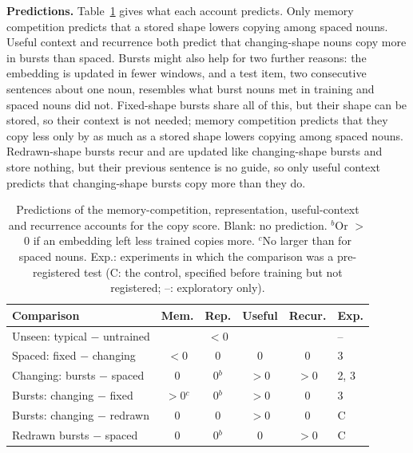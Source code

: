 \documentclass[11pt]{article}
\begin{document}
\textbf{Predictions.} Table~\ref{tab:pred} gives what each account predicts. Only memory competition predicts that a stored shape lowers copying among spaced nouns. Useful context and recurrence both predict that changing-shape nouns copy more in bursts than spaced. Bursts might also help for two further reasons: the embedding is updated in fewer windows, and a test item, two consecutive sentences about one noun, resembles what burst nouns met in training and spaced nouns did not. Fixed-shape bursts share all of this, but their shape can be stored, so their context is not needed; memory competition predicts that they copy less only by as much as a stored shape lowers copying among spaced nouns. Redrawn-shape bursts recur and are updated like changing-shape bursts and store nothing, but their previous sentence is no guide, so only useful context predicts that changing-shape bursts copy more than they do.

\begin{table}[t]
\centering
\small
\setlength{\tabcolsep}{1.5pt}
\begin{tabular}{@{}>{\raggedright\arraybackslash}p{}ccccl@{}}
\toprule
Comparison & Mem. & Rep. & Useful & Recur. & Exp. \\
\midrule
Unseen: typical $-$ untrained & & $<$0 & & & -- \\
Spaced: fixed $-$ changing & $<$0 & 0 & 0 & 0 & 3 \\
Changing: bursts $-$ spaced & 0 & 0$^b$ & $>$0 & $>$0 & 2, 3 \\
Bursts: changing $-$ fixed & $>$0$^c$ & 0$^b$ & $>$0 & 0 & 3 \\
Bursts: changing $-$ redrawn & 0 & 0 & $>$0 & 0 & C \\
Redrawn bursts $-$ spaced & 0 & 0$^b$ & 0 & $>$0 & C \\
\bottomrule
\end{tabular}
\caption{Predictions of the memory-competition, representation, useful-context and recurrence accounts for the copy score. Blank: no prediction. $^b$Or $>$0 if an embedding left less trained copies more. $^c$No larger than for spaced nouns. Exp.: experiments in which the comparison was a pre-registered test (C: the control, specified before training but not registered; --: exploratory only).}
\label{tab:pred}
\end{table}
\end{document}
